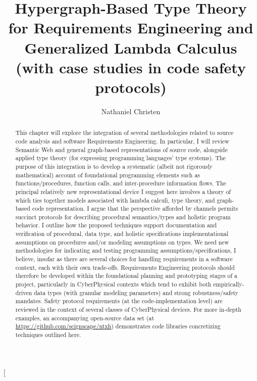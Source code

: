 \documentclass[11pt,twocolumn]{article}
\begin{document}
\title{Hypergraph-Based Type Theory for Requirements Engineering and
Generalized Lambda Calculus (with case studies in code safety protocols)}
\author{Nathaniel Christen}
\twocolumn[\begin{@twocolumnfalse}
\maketitle{}
\begin{abstract}This chapter will explore the integration of several methodologies 
related to source code analysis and software Requirements 
Engineering.  In particular, I will review Semantic Web 
and general graph-based representations of source code, 
alongside applied type theory (for expressing 
programming languages' type systems).  The purpose of this 
integration is to develop a systematic (albeit not 
rigorously mathematical) account of foundational programming 
elements such as functions/procedures, function calls, and 
inter-procedure information flows.  The principal relatively new 
representational device I suggest here involves a theory 
of  which ties together models associated with 
lambda calculi, type theory, and graph-based code representation.  
I argue that the perspective afforded by channels permits 
succinct protocols for describing procedural 
semantics/types and holistic program behavior.  I 
outline how the proposed techniques support documentation and 
verification of procedural, data type, and holistic 
specifications \mdash{} implementational assumptions on procedures  
and/or modeling assumptions on types.   
We need new methodologies for indicating and testing 
programming assumptions/specifications, I believe, insofar as 
there are several choices for handling requirements in 
a software context, each with their own trade-offs.  
Requirements Engineering protocols should therefore 
be developed within the foundational planning and 
prototyping stages of a project, particularly
in CyberPhysical contexts which tend to exhibit both 
empirically-driven data types (with granular 
modeling parameters) and strong robustness/safety mandates.
Safety protocol requirements (at the code-implementation level) 
are reviewed in the context of several classes 
of CyberPhysical devices.  For more in-depth 
examples, an accompanying open-source data set (at
\url{https://github.com/scignscape/ntxh}) 
demonstrates code libraries concretizing 
techniques outlined here.
\end{abstract} 
\newsavebox{\qboxii}

\end{@twocolumnfalse}
\end{document}
